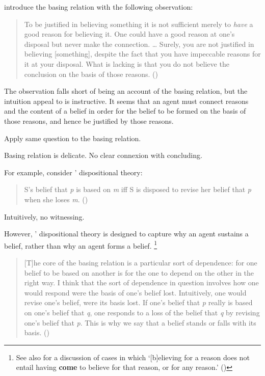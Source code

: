 \begin{note}
  \citeauthor{Pollock:1999tm} introduce the basing relation with the following observation:
  \begin{quote}
    To be justified in believing something it is not sufficient merely to \emph{have} a good reason for believing it.
    One could have a good reason at one's disposal but never make the connection.
    \dots
    Surely, you are not justified in believing [something], despite the fact that you have impeccable reasons for it at your disposal.
    What is lacking is that you do not believe the conclusion on the basis of those reasons.\linebreak
    \mbox{}\hfill\mbox{(\Citeyear[35]{Pollock:1999tm})}
  \end{quote}
  The observation falls short of being an account of the basing relation, but the intuition \citeauthor{Pollock:1999tm} appeal to is instructive.
  It seems that an agent must connect reasons and the content of a belief in order for the belief to be formed on the basis of those reasons, and hence be justified by those reasons.
\end{note}

\begin{note}
  Apply same question to the basing relation.
\end{note}

\begin{note}
  Basing relation is delicate.
  No clear connexion with concluding.

  For example, consider \citeauthor{Evans:2013tw}' dispositional theory:

  \begin{quote}
    S's belief that \emph{p} is based on \emph{m} iff S is disposed to revise her belief that \emph{p} when she loses \emph{m}.%
    \mbox{}\hfill\mbox{(\citeyear[2952]{Evans:2013tw})}
  \end{quote}

  Intuitively, no witnessing.

  However, \citeauthor{Evans:2013tw}' dispositional theory is designed to capture why an agent sustains a belief, rather than why an agent forms a belief.%
  \footnote{
    See also \textcite{Audi:1986to} for a discussion of cases in which `[b]elieving for a reason does not entail having \textbf{come} to believe for that reason, or for any reason.' (\citeyear[32--33]{Audi:1986to})
  }

  \begin{quote}
    [T]he core of the basing relation is a particular sort of dependence:
    for one belief to be based on another is for the one to depend on the other in the right way.
    I think that the sort of dependence in question involves how one would respond were the basis of one's belief lost.
    Intuitively, one would revise one's belief, were its basis lost.
    If one's belief that \emph{p} really is based on one's belief that \emph{q}, one responds to a loss of the belief that \emph{q} by revising one's belief that \emph{p}.
    This is why we say that a belief stands or falls with its basis.%
    \mbox{}\hfill\mbox{(\citeyear[2951]{Evans:2013tw})}
  \end{quote}
\end{note}

